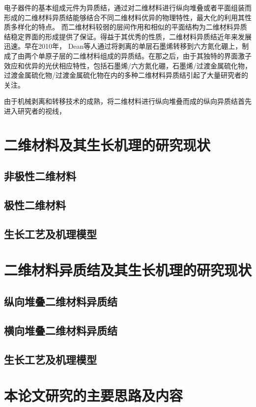 电子器件的基本组成元件为异质结，通过对二维材料进行纵向堆叠或者平面组装而形成的二维材料异质结能够结合不同二维材料优异的物理特性，最大化的利用其性质多样化的特点。 而二维材料较弱的层间作用和相似的平面结构为二维材料异质结稳定界面的形成提供了保证。得益于其优秀的性质，二维材料异质结近年来发展迅速。早在2010年， Dean等人通过将剥离的单层石墨烯转移到六方氮化硼上，制成了由两个单原子层的二维材料组成的异质结。在那之后，由于其独特的界面激子效应和优异的光伏相应特性，包括石墨烯/六方氮化硼，石墨烯/过渡金属硫化物，过渡金属硫化物/过渡金属硫化物在内的多种二维材料异质结引起了大量研究者的关注。

由于机械剥离和转移技术的成熟，将二维材料进行纵向堆叠而成的纵向异质结首先进入研究者的视线，

\section{二维材料及其生长机理的研究现状}
\subsection{非极性二维材料}
\subsection{极性二维材料}
\subsection{生长工艺及机理模型}

\section{二维材料异质结及其生长机理的研究现状}
\subsection{纵向堆叠二维材料异质结}
\subsection{横向堆叠二维材料异质结}
\subsection{生长工艺及机理模型}

\section{本论文研究的主要思路及内容}